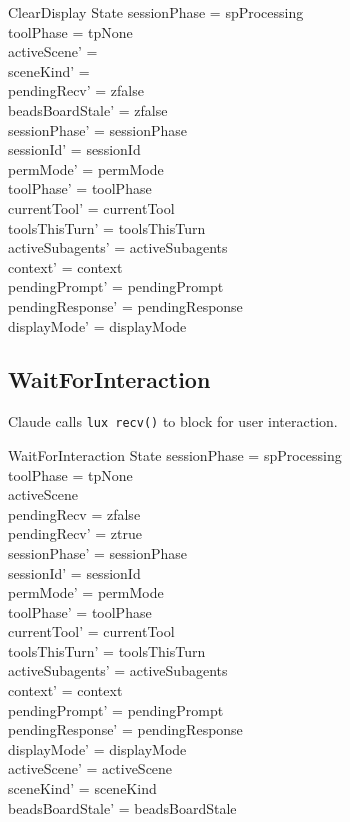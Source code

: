 \documentclass[a4paper,10pt,fleqn]{article}
\begin{document}
\begin{schema}{ClearDisplay}
  \Delta State
  \where
  sessionPhase = spProcessing \\
  toolPhase = tpNone \\
  activeScene' = \emptyset \\
  sceneKind' = \emptyset \\
  pendingRecv' = zfalse \\
  beadsBoardStale' = zfalse \\
  sessionPhase' = sessionPhase \\
  sessionId' = sessionId \\
  permMode' = permMode \\
  toolPhase' = toolPhase \\
  currentTool' = currentTool \\
  toolsThisTurn' = toolsThisTurn \\
  activeSubagents' = activeSubagents \\
  context' = context \\
  pendingPrompt' = pendingPrompt \\
  pendingResponse' = pendingResponse \\
  displayMode' = displayMode
\end{schema}

\subsection{WaitForInteraction}

Claude calls \texttt{lux recv()} to block for user interaction.

\begin{schema}{WaitForInteraction}
  \Delta State
  \where
  sessionPhase = spProcessing \\
  toolPhase = tpNone \\
  activeScene \neq \emptyset \\
  pendingRecv = zfalse \\
  pendingRecv' = ztrue \\
  sessionPhase' = sessionPhase \\
  sessionId' = sessionId \\
  permMode' = permMode \\
  toolPhase' = toolPhase \\
  currentTool' = currentTool \\
  toolsThisTurn' = toolsThisTurn \\
  activeSubagents' = activeSubagents \\
  context' = context \\
  pendingPrompt' = pendingPrompt \\
  pendingResponse' = pendingResponse \\
  displayMode' = displayMode \\
  activeScene' = activeScene \\
  sceneKind' = sceneKind \\
  beadsBoardStale' = beadsBoardStale
\end{schema}
\end{document}
